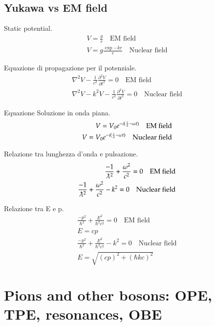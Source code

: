 \documentclass[main.tex]{subfiles}
\begin{document}
\subsection{Yukawa vs EM field}
\begin{itemize*}

\item Static potential.
\begin{align*}
V=\frac{g}{r}\quad\text{EM field}\\
V=g\frac{\exp{-kr}}{r}\quad\text{Nuclear field}
\end{align*}

\item Equazione di propagazione per il potenziale.
\begin{align*}
\nabla^2V-\frac{1}{c^2}\frac{\partial^2V}{\partial t^2}=0\quad\text{EM field}\\
\nabla^2V-k^2V-\frac{1}{c^2}\frac{\partial^2V}{\partial t^2}=0\quad\text{Nuclear field}
\end{align*}

\item Equazione Soluzione in onda piana.
\begin{align*}
V=V_0\exp{-i(\frac{z}{\lambdabar}-\omega t)}\quad\text{EM field}\\
V=V_0\exp{-i(\frac{z}{\lambdabar}-\omega t)}\quad\text{Nuclear field}
\end{align*}

\item Relazione tra lunghezza d'onda e pulsazione.
\begin{align*}
\frac{-1}{\lambdabar^2}+\frac{\omega^2}{c^2}=0\quad\text{EM field}\\
\frac{-1}{\lambdabar^2}+\frac{\omega^2}{c^2}-k^2=0\quad\text{Nuclear field}
\end{align*}

\item Relazione tra E e p.
\begin{align*}
\frac{-p^2}{\hbar^2}+\frac{E^2}{\hbar^2c^2}=0\quad\text{EM field}\\
E=cp\\
\frac{-p^2}{\hbar^2}+\frac{E^2}{\hbar^2c^2}-k^2=0\quad\text{Nuclear field}\\
E=\sqrt{(cp)^2+(\hbar kc)^2}
\end{align*}

\end{itemize*}


\section{Pions and other bosons: OPE, TPE, resonances, OBE}
\end{document}
